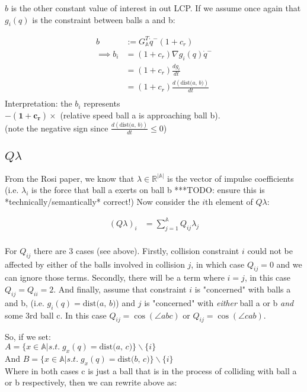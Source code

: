 \documentclass[12pt]{article}
\newcommand{\GA}{G_{\mathbb{A}}}
\newcommand{\bigA}{{\mathbb{A}}}
\newcommand{\dist}[2]{\text{dist(} #1 \text{, } #2 \text{)}}
\begin{document}
$b$ is the other constant value of interest in out LCP. If we assume once again that
$g_i(q)$ is the constraint between balls a and b:

\begin{align*}
    b   &:= \GA^T \dot{q}^-(1 + c_r)\\
    \implies b_i &= (1 + c_r) \nabla g_i(q) \dot{q}^-\\
    &= (1 + c_r) \frac{dg_i}{dt}\\
    &= (1 + c_r) \frac{d(\dist{a}{b})}{dt}\\
\end{align*}
Interpretation: the $b_i$ represents\\
\indent $\mathbf{-(1+c_r)} \times$ (relative speed ball a is approaching ball b).\\
(note the negative sign since $\frac{d(\dist{a}{b})}{dt} \leq 0$)

\subsection*{$Q \lambda$}

From the Rosi paper, we know that $\lambda \in \mathbb{R}^{|\mathbb{A}|}$ is the vector of
impulse coefficients (i.e. $\lambda_i$ is the force that ball a exerts on ball b
***TODO: ensure this is *technically/semantically* correct!)
Now consider the $i$th element of $Q\lambda$:

\begin{align*}
(Q \lambda)_i 
    &= \sum_{j = 1}^{\bigA} Q_{ij} \lambda_j\\
\end{align*}

For $Q_{ij}$ there are 3 cases (see above). Firstly, collision constraint $i$ could
not be affected by either of the balls involved in collision $j$, in which case $Q_{ij} = 0$
and we can ignore those terms. Secondly, there will be a term where $i = j$, in this case
$Q_{ij} = Q_{ii} = 2$. And finally, assume that constraint $i$ is "concerned" with balls a and b,
(i.e. $g_i(q) = \dist{a}{b}$) and $j$ is "concerned" with \textit{either}
ball a or b \textit{and} some 3rd ball c. In this case
$Q_{ij} = \cos(\angle abc)$ or $Q_{ij} = \cos(\angle cab)$.

So, if we set:\\
$A = \{x \in \bigA | s.t. \; g_x(q) = \dist{a}{c}\} \backslash \{i\}$ \\
And $B = \{x \in \bigA | s.t. \; g_x(q) = \dist{b}{c}\} \backslash \{i\}$  \\
Where in both cases c is just a ball that is in the process of colliding with ball a or b respectively, then
we can rewrite above as:
\end{document}

